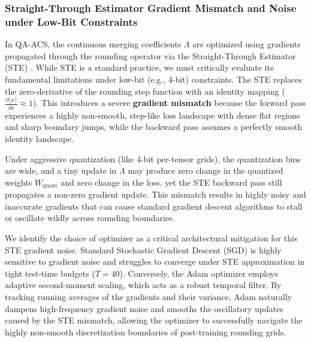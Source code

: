 \subsubsection{Straight-Through Estimator Gradient Mismatch and Noise under Low-Bit Constraints}
In QA-ACS, the continuous merging coefficients $\Lambda$ are optimized using gradients propagated through the rounding operator via the Straight-Through Estimator (STE) \cite{bengio2013estimating}. While STE is a standard practice, we must critically evaluate its fundamental limitations under low-bit (e.g., 4-bit) constraints. The STE replaces the zero-derivative of the rounding step function with an identity mapping ($\frac{\partial \lfloor x \rceil}{\partial x} \approx 1$). This introduces a severe \textbf{gradient mismatch} because the forward pass experiences a highly non-smooth, step-like loss landscape with dense flat regions and sharp boundary jumps, while the backward pass assumes a perfectly smooth identity landscape.

Under aggressive quantization (like 4-bit per-tensor grids), the quantization bins are wide, and a tiny update in $\Lambda$ may produce zero change in the quantized weights $W_{\text{quant}}$ and zero change in the loss, yet the STE backward pass still propagates a non-zero gradient update. This mismatch results in highly noisy and inaccurate gradients that can cause standard gradient descent algorithms to stall or oscillate wildly across rounding boundaries. 

We identify the choice of optimizer as a critical architectural mitigation for this STE gradient noise. Standard Stochastic Gradient Descent (SGD) is highly sensitive to gradient noise and struggles to converge under STE approximation in tight test-time budgets ($T=40$). Conversely, the Adam optimizer \cite{kingma2014adam} employs adaptive second-moment scaling, which acts as a robust temporal filter. By tracking running averages of the gradients and their variance, Adam naturally dampens high-frequency gradient noise and smooths the oscillatory updates caused by the STE mismatch, allowing the optimizer to successfully navigate the highly non-smooth discretization boundaries of post-training rounding grids.

